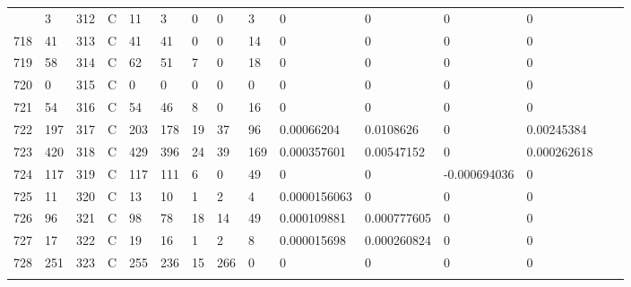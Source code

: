 \begin{longtable}{lllllllllllllll}
\begin{comment}
	717 & 3                 & 312 & C   & 11                & 3                 & 0                 & 0    & 3          & 0              & 0              & 0             & 0            \\
	718 & 41                & 313 & C   & 41                & 41                & 0                 & 0    & 14         & 0              & 0              & 0             & 0            \\
	719 & 58                & 314 & C   & 62                & 51                & 7                 & 0    & 18         & 0              & 0              & 0             & 0            \\
	720 & 0                 & 315 & C   & 0                 & 0                 & 0                 & 0    & 0          & 0              & 0              & 0             & 0            \\
	721 & 54                & 316 & C   & 54                & 46                & 8                 & 0    & 16         & 0              & 0              & 0             & 0            \\
	722 & 197               & 317 & C   & 203               & 178               & 19                & 37   & 96         & 0.00066204     & 0.0108626      & 0             & 0.00245384   \\
	723 & 420               & 318 & C   & 429               & 396               & 24                & 39   & 169        & 0.000357601    & 0.00547152     & 0             & 0.000262618  \\
	724 & 117               & 319 & C   & 117               & 111               & 6                 & 0    & 49         & 0              & 0              & -0.000694036  & 0            \\
	725 & 11                & 320 & C   & 13                & 10                & 1                 & 2    & 4          & 0.0000156063   & 0              & 0             & 0            \\
	726 & 96                & 321 & C   & 98                & 78                & 18                & 14   & 49         & 0.000109881    & 0.000777605    & 0             & 0            \\
	727 & 17                & 322 & C   & 19                & 16                & 1                 & 2    & 8          & 0.000015698    & 0.000260824    & 0             & 0            \\
	728 & 251               & 323 & C   & 255               & 236               & 15                & 266  & 0          & 0              & 0              & 0             & 0            \\

\end{comment}
\end{longtable}
